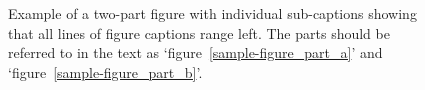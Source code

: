 \documentclass{rQUF2e}
\theoremstyle{plain}
\theoremstyle{definition}
\theoremstyle{remark}
\begin{document}
\begin{figure}
\begin{center}
\begin{minipage}{110mm}
\caption{Example of a two-part figure with individual sub-captions showing that all lines of figure captions range left. The parts should be referred to in the text as `figure~\ref{sample-figure_part_a}' and `figure~\ref{sample-figure_part_b}'.
\label{sample-figure}}
\end{minipage}
\end{center}
\end{figure}
\end{document}
